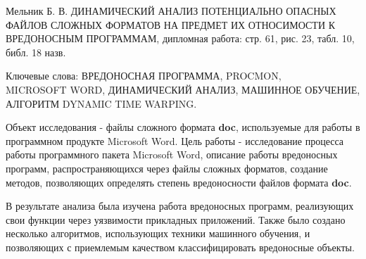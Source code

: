 
Мельник Б. В. ДИНАМИЧЕСКИЙ АНАЛИЗ ПОТЕНЦИАЛЬНО ОПАСНЫХ ФАЙЛОВ СЛОЖНЫХ ФОРМАТОВ НА ПРЕДМЕТ ИХ ОТНОСИМОСТИ К ВРЕДОНОСНЫМ ПРОГРАММАМ, дипломная работа: стр. 61, рис. 23, табл. 10, библ. 18 назв.

Ключевые слова: ВРЕДОНОСНАЯ ПРОГРАММА, PROCMON, \\MICROSOFT WORD, ДИНАМИЧЕСКИЙ АНАЛИЗ, МАШИННОЕ ОБУЧЕНИЕ, АЛГОРИТМ DYNAMIC TIME WARPING.

Объект исследования - файлы сложного формата \textbf{doc}, используемые для работы в программном продукте Microsoft Word.
Цель работы - исследование процесса работы программного пакета Microsoft Word, описание работы вредоносных программ, распространяющихся через файлы сложных форматов, создание методов, позволяющих определять степень вредоносности файлов формата \textbf{doc}.

В результате анализа была изучена работа вредоносных программ, реализующих свои функции через уязвимости прикладных приложений.
Также было создано несколько алгоритмов, использующих техники машинного обучения, и позволяющих с приемлемым качеством классифицировать вредоносные объекты.